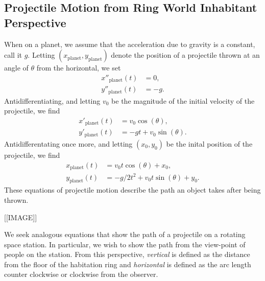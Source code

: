 \documentclass{amsart}
\theoremstyle{definition}
\begin{document}
\subsection{Projectile Motion from Ring World Inhabitant Perspective}


When on a planet, we assume that the acceleration due to gravity is a
constant, call it $g$. Letting
$(x_{\mathrm{planet}},y_{\mathrm{planet}})$ denote the position
of a projectile thrown at an angle of $\theta$ from the horizontal, we
set
\begin{align*}
  x''_{\mathrm{planet}}(t) &= 0,\\
  y''_{\mathrm{planet}}(t) &= -g.
\end{align*}
Antidifferentiating, and letting $v_0$ be the magnitude of the initial
velocity of the projectile, we find
\begin{align*}
  x'_{\mathrm{planet}}(t) &= v_0 \cos(\theta),\\
  y'_{\mathrm{planet}}(t) &= -g t  + v_0 \sin(\theta).
\end{align*}
Antidifferentating once more, and letting $(x_0,y_0)$ be the
inital position of the projectile, we find
\begin{align*}
  x_{\mathrm{planet}}(t) &=  v_0 t \cos(\theta)  + x_0,\\
  y_{\mathrm{planet}}(t) &=  -g/2 t^2 + v_0 t \sin(\theta)  + y_0.
\end{align*}
These equations of projectile motion describe the path an object takes
after being thrown.

[[IMAGE]]

We seek analogous equations that show the path of a projectile on a
rotating space station. In particular, we wish to show the path from
the view-point of people on the station.  From this perspective,
\textit{vertical} is defined as the distance from the floor of the
habitation ring and \textit{horizontal} is defined as the arc length
counter clockwise or clockwise from the observer.
\end{document}
